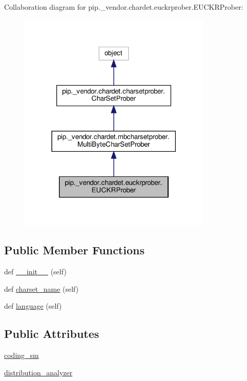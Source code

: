 Collaboration diagram for pip.\+\_\+vendor.\+chardet.\+euckrprober.\+E\+U\+C\+K\+R\+Prober\+:
\nopagebreak
\begin{figure}[H]
\begin{center}
\leavevmode
\includegraphics[width=261pt]{classpip_1_1__vendor_1_1chardet_1_1euckrprober_1_1EUCKRProber__coll__graph}
\end{center}
\end{figure}
\subsection*{Public Member Functions}
\begin{DoxyCompactItemize}
\item 
def \hyperlink{classpip_1_1__vendor_1_1chardet_1_1euckrprober_1_1EUCKRProber_a699f7f958e37d2fde23f845901b3a55a}{\+\_\+\+\_\+init\+\_\+\+\_\+} (self)
\item 
def \hyperlink{classpip_1_1__vendor_1_1chardet_1_1euckrprober_1_1EUCKRProber_af329c87186557a918eb578ff34f90872}{charset\+\_\+name} (self)
\item 
def \hyperlink{classpip_1_1__vendor_1_1chardet_1_1euckrprober_1_1EUCKRProber_ae0af5ccf866ab59e7d7547b00f75d200}{language} (self)
\end{DoxyCompactItemize}
\subsection*{Public Attributes}
\begin{DoxyCompactItemize}
\item 
\hyperlink{classpip_1_1__vendor_1_1chardet_1_1euckrprober_1_1EUCKRProber_ab92216bc982bbcc264c841d0ef81e52f}{coding\+\_\+sm}
\item 
\hyperlink{classpip_1_1__vendor_1_1chardet_1_1euckrprober_1_1EUCKRProber_a87764d719ae8dcaa194676e1b16ba0b6}{distribution\+\_\+analyzer}
\end{DoxyCompactItemize}
